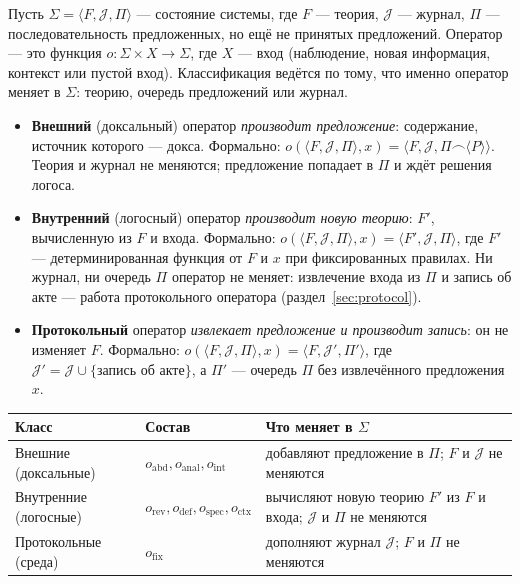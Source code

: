 \documentclass[12pt,a4paper]{article}
\begin{document}
Пусть $\Sigma = \langle F, \mathcal{J}, \Pi \rangle$ --- состояние
системы, где $F$ --- теория, $\mathcal{J}$ --- журнал, $\Pi$ ---
последовательность предложенных, но ещё не принятых предложений. Оператор --- это
функция $o: \Sigma \times X \to \Sigma$, где $X$ --- вход (наблюдение, новая
информация, контекст или пустой вход). Классификация ведётся по тому, что
именно оператор меняет в $\Sigma$: теорию, очередь предложений или журнал.

\begin{itemize}
	\item \textbf{Внешний} (доксальный) оператор \emph{производит предложение}:
      содержание, источник которого --- докса. Формально:
      $o(\langle F, \mathcal{J}, \Pi \rangle, x)
      = \langle F, \mathcal{J}, \Pi \frown \langle P \rangle \rangle$.
      Теория и журнал не меняются; предложение попадает в $\Pi$ и ждёт
      решения логоса.
	\item \textbf{Внутренний} (логосный) оператор \emph{производит новую теорию}:
      $F'$, вычисленную из $F$ и входа. Формально:
      $o(\langle F, \mathcal{J}, \Pi \rangle, x)
      = \langle F', \mathcal{J}, \Pi \rangle$,
      где $F'$ --- детерминированная функция от $F$ и $x$ при фиксированных
      правилах. Ни журнал, ни очередь $\Pi$ оператор не меняет: извлечение
      входа из $\Pi$ и запись об акте --- работа протокольного оператора
      (раздел~\ref{sec:protocol}).
	\item \textbf{Протокольный} оператор \emph{извлекает предложение и
      производит запись}: он не изменяет $F$. Формально:
      $o(\langle F, \mathcal{J}, \Pi \rangle, x)
      = \langle F, \mathcal{J}', \Pi' \rangle$,
      где $\mathcal{J}' = \mathcal{J} \cup \{\text{запись об акте}\}$,
      а $\Pi'$ --- очередь $\Pi$ без извлечённого предложения $x$.
\end{itemize}

\vspace{1em}
\noindent
\begin{tabularx}{\textwidth}{>{\raggedright\arraybackslash}p{2.9cm}>{\raggedright\arraybackslash}X>{\raggedright\arraybackslash}X}
\hline
\textbf{Класс} & \textbf{Состав} & \textbf{Что меняет в $\Sigma$} \\
\hline
Внешние (доксальные) & $o_{\text{abd}}, o_{\text{anal}}, o_{\text{int}}$ & добавляют предложение в $\Pi$; $F$ и $\mathcal{J}$ не меняются \\
Внутренние (логосные) & $o_{\text{rev}}, o_{\text{def}}, o_{\text{spec}}, o_{\text{ctx}}$ & вычисляют новую теорию $F'$ из $F$ и входа; $\mathcal{J}$ и $\Pi$ не меняются \\
Протокольные (среда) & $o_{\text{fix}}$ & дополняют журнал $\mathcal{J}$; $F$ и $\Pi$ не меняются \\
\hline
\end{tabularx}
\end{document}
